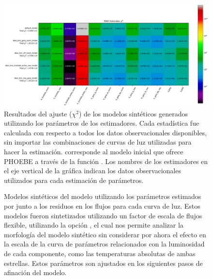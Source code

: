 \begin{figure}[!ht]
	\centering
	\includegraphics[scale=0.4]{Metodologia/Secciones/ModeloComputacional/Figures/EstimadoresChiResultados.png}

	\caption{Resultados del ajuste ($\chi^2$) de los modelos sintéticos
		generados utilizando los parámetros de los estimadores. Cada estadística fue
		calculada con respecto a todos los datos observacionales disponibles, sin
		importar las combinaciones de curvas de luz utilizadas para hacer la
		estimación.  corresponde al modelo inicial que ofrece
		PHOEBE a través de la función . Los
		nombres de los estimadores en el eje vertical de la gráfica indican los
		datos observacionales utilizados para cada estimación de parámetros.}
	\label{chiSqrdFigure}
\end{figure}

\begin{figure}[!ht]
	\centering

	\caption{Modelos sintéticos del modelo utilizando los parámetros estimados
	por  junto a los residuos en los flujos para
	cada curva de luz. Estos modelos fueron sintetizados utilizando un factor de
	escala de flujos flexible, utilizando la opción , el cual nos permite analizar la morfología del modelo
	sintético sin considerar por ahora el efecto en la escala de la curva de
	parámetros relacionados con la luminosidad de cada componente, como las
	temperaturas absolutas de ambas estrellas. Estos parámetros son ajustados en
	los siguientes pasos de afinación del modelo.}
	\label{ebaiKnnGaiaEstimateModel}
\end{figure}

